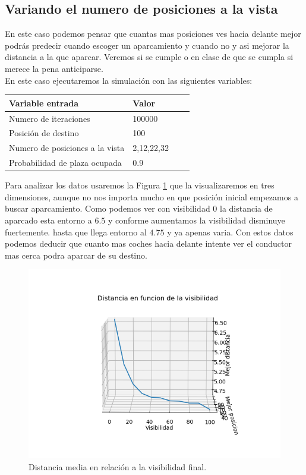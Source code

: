 \documentclass[12pt,a4paper]{article}
\begin{document}
\subsection{Variando el numero de posiciones a la vista}
En este caso podemos pensar que cuantas mas posiciones ves hacia delante mejor podrás  predecir cuando escoger un aparcamiento y cuando no y asi mejorar la distancia a la que aparcar. Veremos si se cumple o en clase de que se cumpla si merece la pena anticiparse.\\
En este caso ejecutaremos la simulación con las siguientes variables:
\begin{table}[H]
	\centering
	\begin{tabular}{|l|l|l|l|}
		\hline
		\textbf{Variable entrada} & \textbf{Valor}\\ \hline
		Numero de iteraciones&100000\\ \hline
		Posición de destino&100\\ \hline
		Numero de posiciones a la vista&2,12,22,32\\ \hline
		Probabilidad de plaza ocupada&0.9\\ \hline
	\end{tabular}
\end{table}
Para analizar los datos usaremos la Figura \ref{fig:distanciaVisibilidad} que la visualizaremos en tres dimensiones, aunque no nos importa mucho en que posición inicial empezamos a buscar aparcamiento. Como podemos ver con visibilidad $0$  la distancia de aparcado esta entorno a $6.5$ y conforme aumentamos la visibilidad disminuye fuertemente. hasta que llega entorno al $4.75$ y ya apenas varia. Con estos datos podemos deducir que cuanto mas coches hacia delante intente ver el conductor mas cerca podra aparcar de su destino. 
\begin{figure}[H]
	\centering
	\includegraphics{images/distanciaVisivilidad.png}
	\caption{Distancia media en relación a la visibilidad final.}
	\label{fig:distanciaVisibilidad}
\end{figure}
\end{document}

